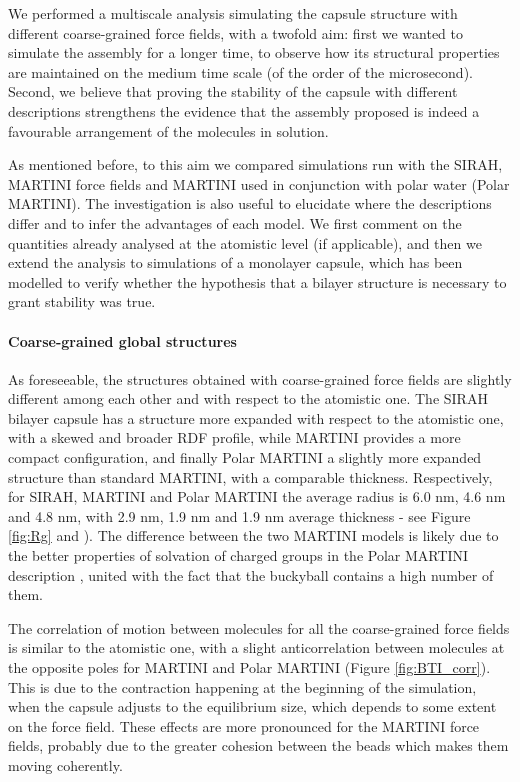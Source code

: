 We performed a multiscale analysis simulating the capsule structure with different coarse-grained force fields, with a twofold aim: first we wanted to simulate the assembly for a longer time, to observe how its structural properties are maintained on the medium time scale (of the order of the microsecond). Second, we believe that proving the stability of the capsule with different descriptions strengthens the evidence that the assembly proposed is indeed a favourable arrangement of the molecules in solution.

As mentioned before, to this aim we compared simulations run with the SIRAH, MARTINI force fields and MARTINI used in conjunction with polar water (Polar MARTINI). The investigation is also useful to elucidate where the descriptions differ and to infer the advantages of each model.
%
We first comment on the quantities already analysed at the atomistic level (if applicable), and then we extend the analysis to simulations of a monolayer capsule, which has been modelled to verify whether the hypothesis that a bilayer structure is necessary to grant stability was true.

\paragraph{Coarse-grained global structures}
As foreseeable, the structures obtained with coarse-grained force fields are slightly different among each other and with respect to the atomistic one.
%
The SIRAH bilayer capsule has a structure more expanded with respect to the atomistic one, with a skewed and broader RDF profile, while MARTINI provides a more compact configuration, and finally Polar MARTINI a slightly more expanded structure than standard MARTINI, with a comparable thickness. Respectively, for SIRAH, MARTINI and Polar MARTINI the average radius is 6.0 nm, 4.6 nm and 4.8 nm, with 2.9 nm, 1.9 nm and 1.9 nm average thickness - see Figure \ref{fig:Rg} and ).
%
The difference between the two MARTINI models is likely due to the better properties of solvation of charged groups in the Polar MARTINI description \citep{Yesylevskyy2010}, united with the fact that the buckyball contains a high number of them.

The correlation of motion between molecules for all the coarse-grained force fields is similar to the atomistic one, with a slight anticorrelation between molecules at the opposite poles for MARTINI and Polar MARTINI (Figure \ref{fig:BTI_corr}). This is due to the contraction happening at the beginning of the simulation, when the capsule adjusts to the equilibrium size, which depends to some extent on the force field.
%
These effects are more pronounced for the MARTINI force fields, probably due to the greater cohesion between the beads which makes them moving coherently.

